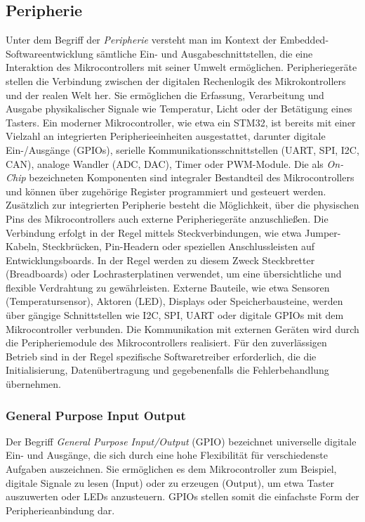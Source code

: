 \subsection*{Peripherie}
Unter dem Begriff der \emph{Peripherie} versteht man im Kontext der Embedded-Softwareentwicklung sämtliche Ein- und Ausgabeschnittstellen, die eine Interaktion des Mikrocontrollers mit seiner Umwelt ermöglichen.
Peripheriegeräte stellen die Verbindung zwischen der digitalen Rechenlogik des Mikrokontrollers und der realen Welt her.
Sie ermöglichen die Erfassung, Verarbeitung und Ausgabe physikalischer Signale wie Temperatur, Licht oder der Betätigung eines Tasters.
Ein moderner Mikrocontroller, wie etwa ein STM32, ist bereits mit einer Vielzahl an integrierten Peripherieeinheiten ausgestattet, darunter digitale Ein-/Ausgänge (GPIOs), serielle Kommunikationsschnittstellen (UART, SPI, I2C, CAN), analoge Wandler (ADC, DAC), Timer oder PWM-Module. 
Die als \emph{On-Chip} bezeichneten Komponenten sind integraler Bestandteil des Mikrocontrollers und können über zugehörige Register programmiert und gesteuert werden.
Zusätzlich zur integrierten Peripherie besteht die Möglichkeit, über die physischen Pins des Mikrocontrollers auch externe Peripheriegeräte anzuschließen. 
Die Verbindung erfolgt in der Regel mittels Steckverbindungen, wie etwa Jumper-Kabeln, Steckbrücken, Pin-Headern oder speziellen Anschlussleisten auf Entwicklungsboards. 
In der Regel werden zu diesem Zweck Steckbretter (Breadboards) oder Lochrasterplatinen verwendet, um eine übersichtliche und flexible Verdrahtung zu gewährleisten. 
Externe Bauteile, wie etwa Sensoren (Temperatursensor), Aktoren (LED), Displays oder Speicherbausteine, werden über gängige Schnittstellen wie I2C, SPI, UART oder digitale GPIOs mit dem Mikrocontroller verbunden.
Die Kommunikation mit externen Geräten wird durch die Peripheriemodule des Mikrocontrollers realisiert. 
Für den zuverlässigen Betrieb sind in der Regel spezifische Softwaretreiber erforderlich, die die Initialisierung, Datenübertragung und gegebenenfalls die Fehlerbehandlung übernehmen.

\subsubsection*{General Purpose Input Output}
Der Begriff \emph{General Purpose Input/Output} (GPIO) bezeichnet universelle digitale Ein- und Ausgänge, die sich durch eine hohe Flexibilität für verschiedenste Aufgaben auszeichnen.
Sie ermöglichen es dem Mikrocontroller zum Beispiel, digitale Signale zu lesen (Input) oder zu erzeugen (Output), um etwa Taster auszuwerten oder LEDs anzusteuern. 
GPIOs stellen somit die einfachste Form der Peripherieanbindung dar.

